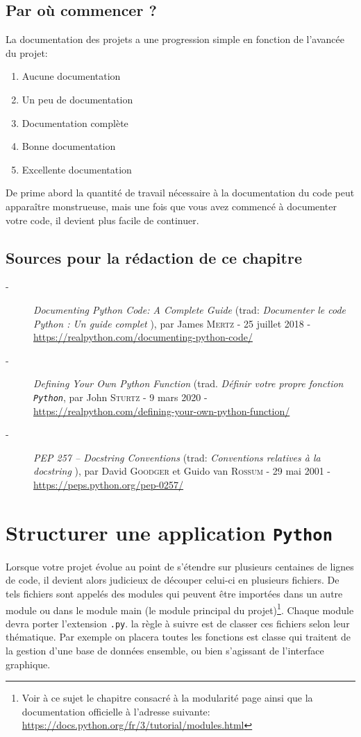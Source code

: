 \documentclass[a4paper,12pt]{book}
\begin{document}
\section{Par où commencer ?}

La documentation des projets a une progression simple en fonction de l'avancée du projet:
\begin{enumerate}
	\item Aucune documentation
	\item Un peu de documentation
	\item Documentation complète
	\item Bonne documentation
	\item Excellente documentation
\end{enumerate}
\medskip

De prime abord la quantité de travail nécessaire à la documentation du code peut apparaître monstrueuse, mais une fois que vous avez commencé à documenter votre code, il devient plus facile de continuer.
\medskip

\section*{Sources pour la rédaction de ce chapitre}
\begin{description}
	\item[-] \textit{Documenting Python Code: A Complete Guide} (trad: \og \textit{Documenter le code Python : Un guide complet} \fg{}), par James \textsc{Mertz} - 25 juillet 2018 - \url{https://realpython.com/documenting-python-code/}
	\item[-] \textit{Defining Your Own Python Function} (trad. \textit{Définir votre propre fonction \texttt{Python}}, par John \textsc{Sturtz} - 9 mars 2020 - \\
	\url{https://realpython.com/defining-your-own-python-function/}
	\item[-] \textit{PEP 257 – Docstring Conventions} (trad: \og \textit{Conventions relatives à la docstring} \fg{}), par David \textsc{Goodger} et Guido van \textsc{Rossum} - 29 mai 2001 - \url{https://peps.python.org/pep-0257/}
\end{description}
\medskip

\chapter{Structurer une application \texttt{Python}}
Lorsque votre projet évolue au point de s'étendre sur plusieurs centaines de lignes de code, il devient alors judicieux de découper celui-ci en plusieurs fichiers. De tels fichiers sont appelés des modules qui peuvent être importées dans un autre module ou dans le module main (le module principal du projet)\footnote{Voir à ce sujet le chapitre consacré à la modularité page \pageref{modularité} ainsi que la documentation officielle à l'adresse suivante: \url{https://docs.python.org/fr/3/tutorial/modules.html}}. Chaque module devra porter l'extension \texttt{.py}. la règle à suivre est de classer ces fichiers selon leur thématique. Par exemple on placera toutes les fonctions est classe qui traitent de la gestion d'une base de données ensemble, ou bien s'agissant de l'interface graphique.
\medskip
\end{document}
